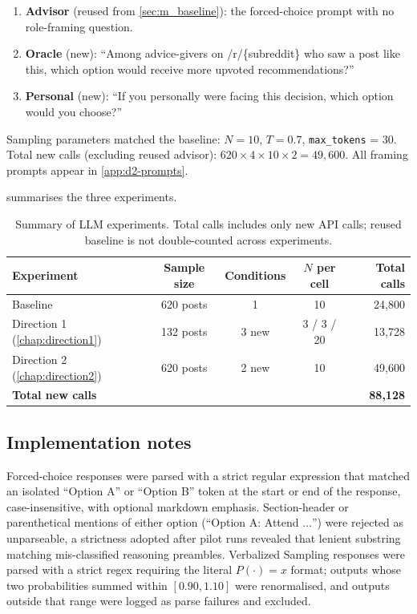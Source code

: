 \begin{enumerate}
\item \textbf{Advisor} (reused from \cref{sec:m_baseline}): the
      forced-choice prompt with no role-framing question.
\item \textbf{Oracle} (new): ``Among advice-givers on /r/\{subreddit\}
      who saw a post like this, which option would receive more upvoted
      recommendations?''
\item \textbf{Personal} (new): ``If you personally were facing this
      decision, which option would you choose?''
\end{enumerate}

Sampling parameters matched the baseline: $N{=}10$, $T = 0.7$,
\texttt{max\_tokens} = 30. Total new calls (excluding reused advisor):
$620 \times 4 \times 10 \times 2 = 49{,}600$. All framing prompts
appear in \cref{app:d2-prompts}.

 summarises the three experiments.

\begin{table}[t]
  \centering
  \caption{Summary of LLM experiments. Total calls includes only new
    API calls; reused baseline is not double-counted across
    experiments.}
  \label{tab:m_experiments}
  \begin{tabular}{lcccr}
    \toprule
    Experiment & Sample size & Conditions & $N$ per cell & Total calls \\
    \midrule
    Baseline                                 & 620 posts & 1 & 10 & 24{,}800 \\
    Direction 1 (\cref{chap:direction1})     & 132 posts & 3 new & 3 / 3 / 20 & 13{,}728 \\
    Direction 2 (\cref{chap:direction2})     & 620 posts & 2 new & 10 & 49{,}600 \\
    \midrule
    \textbf{Total new calls}                 &           &       &     & \textbf{88{,}128} \\
    \bottomrule
  \end{tabular}
\end{table}

\subsection{Implementation notes}
\label{sec:m_implementation}

Forced-choice responses were parsed with a strict regular expression
that matched an isolated ``Option A'' or ``Option B'' token at the
start or end of the response, case-insensitive, with optional
markdown emphasis. Section-header or parenthetical mentions of either
option (``Option A: Attend $\ldots$'') were rejected as unparseable, a
strictness adopted after pilot runs revealed that lenient substring
matching mis-classified reasoning preambles. Verbalized Sampling
responses were parsed with a strict regex requiring the literal
$P(\cdot) = x$ format; outputs whose two probabilities summed within
$[0.90, 1.10]$ were renormalised, and outputs outside that range were
logged as parse failures and excluded.

